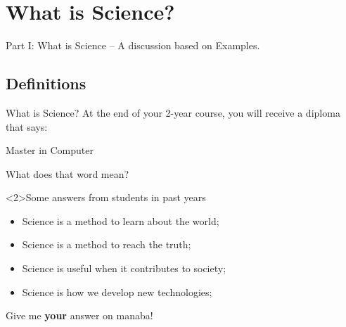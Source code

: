 \section{What is Science?}

\begin{frame}
  \begin{center}
    Part I: What is Science -- A discussion based on Examples.
  \end{center}
\end{frame}

\subsection{Definitions}
\begin{frame}{What is Science?}
  At the end of your 2-year course, you will receive a diploma that says:
  \begin{center}
    Master in Computer 
  \end{center}
  What does that word mean?
  \bigskip

  \begin{block}<2>{Some answers from students in past years}
    \begin{itemize}
      \item Science is a method to learn about the world;
      \item Science is a method to reach the truth;
      \item Science is useful when it contributes to society;
      \item Science is how we develop new technologies;
    \end{itemize}
  \end{block}\bigskip

  Give me {\bf your} answer on manaba!
\end{frame}

